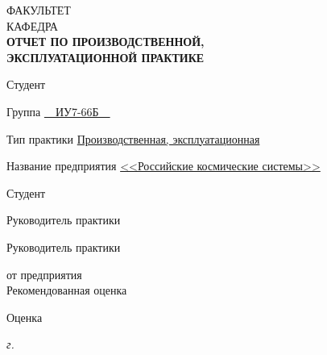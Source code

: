 \begin{titlepage}
{	\small
	ФАКУЛЬТЕТ  \\
	\vspace{3.3mm}
	КАФЕДРА  \\
		
	\vspace{15.8mm}
		\Large \bfseries
		ОТЧЕТ ПО ПРОИЗВОДСТВЕННОЙ,\\
		ЭКСПЛУАТАЦИОННОЙ ПРАКТИКЕ \\
	}

	\vspace{10.8mm}

	Студент \uline{\hfill{}\hfill}
	
	
	\vspace{3.3mm}
	
	Группа \uline{~~ИУ7-66Б~~}
	
	
	\vspace{1.3mm}
	 
	
	Тип практики \uline{\hfill Производственная, эксплуатационная \hfill} 
	
	
	\vspace{1.3mm}
	
	
	Название предприятия \uline{\hfill <<Российские космические системы>> \hfill} \\ 
	
	\vspace{10.8mm}
	
	Студент \hfill
	\uline{} 
	\uline{}
	
	\vspace{1mm}
	
	Руководитель практики \hfill
	\uline{} 
	\uline{}
	
	\vspace{1mm}
	
	Руководитель практики
	
	\vspace{1.5pt}
	
	от предприятия \hfill
	\uline{} 
	\uline{}\\
	
	Рекомендованная оценка \uline{\hspace*{5cm}}
	
	\vspace{3.3mm} 
	
	Оценка \uline{\hspace*{8.9cm}} \\
	
	\vspace{1.3mm} 
	
	\centering 
	{
		\textit{{\the\year} г.}
	}
	

\end{titlepage}